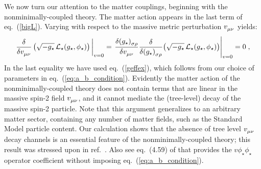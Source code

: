 \documentclass[11pt,a4paper]{article}
\newcommand{\ba}[1]{\begin{align} #1 \end{align}}
\newcommand{\Lcal}{\mathcal{L}}
\newcommand{\eref}[1]{eq.~(\ref{#1})}
\newcommand{\rref}[1]{ref.~\cite{#1}}
\begin{document}
\begin{appendix}
We now turn our attention to the matter couplings, beginning with the nonminimally-coupled theory.  The matter action appears in the last term of \eref{bigL}.  Varying with respect to the massive metric perturbation $v\indices{_\mu_\nu}$ yields: 
\ba{
    \eval{\fdv{v\indices{_\mu_\nu}} \left(\sqrt{-g_\star} \,\Lcal_\star(g_\star,\phi_\star) \right)}_{v=0}
    = \eval{\fdv{(g_\star)\indices{_\sigma_\rho}}{v\indices{_\mu_\nu}} \fdv{(g_\star)\indices{_\sigma_\rho}} (\sqrt{-g_\star} \,\Lcal_\star(g_\star,\phi_\star)) }_{v=0}
    = 0
    \;,
}
In the last equality we have used \eref{geffex}, which follows from our choice of parameters in \eref{eq:a_b_condition}.
Evidently the matter action of the nonminimally-coupled theory does not contain terms that are linear in the massive spin-2 field $v\indices{_\mu_\nu}$, and it cannot mediate the (tree-level) decay of the massive spin-2 particle.  Note that this argument generalizes to an arbitrary matter sector, containing any number of matter fields, such as the Standard Model particle content.  Our calculation shows that the absence of tree level $v\indices{_\mu_\nu}$ decay channels is an essential feature of the nonminimally-coupled theory; this result was stressed upon in \rref{Schmidt-May:2014xla}.  Also see eq.~(4.59) of \cite{Bonifacio:2017nnt} that provides the $v\phi_\star\phi_\star$ operator coefficient without imposing \eref{eq:a_b_condition}.


\end{appendix}
\end{document}
